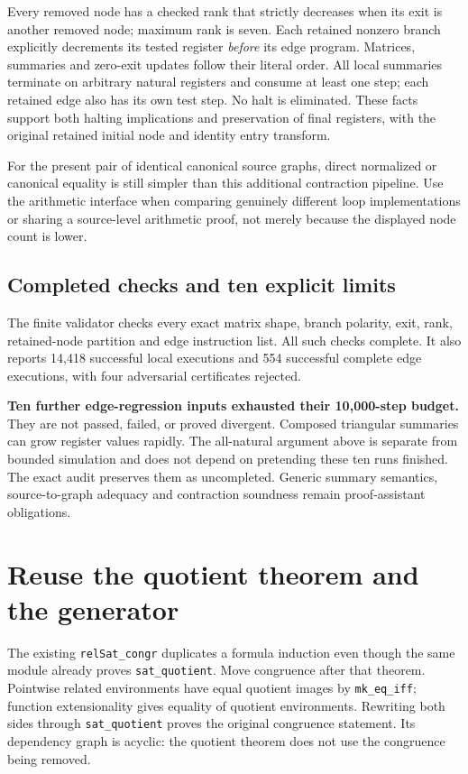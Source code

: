 \documentclass[11pt]{article}
\begin{document}
Every removed node has a checked rank that strictly decreases when its exit is another removed node; maximum rank is seven. Each retained nonzero branch explicitly decrements its tested register \emph{before} its edge program. Matrices, summaries and zero-exit updates follow their literal order. All local summaries terminate on arbitrary natural registers and consume at least one step; each retained edge also has its own test step. No halt is eliminated. These facts support both halting implications and preservation of final registers, with the original retained initial node and identity entry transform.

For the present pair of identical canonical source graphs, direct normalized or canonical equality is still simpler than this additional contraction pipeline. Use the arithmetic interface when comparing genuinely different loop implementations or sharing a source-level arithmetic proof, not merely because the displayed node count is lower.

\subsection{Completed checks and ten explicit limits}
The finite validator checks every exact matrix shape, branch polarity, exit, rank, retained-node partition and edge instruction list. All such checks complete. It also reports 14,418 successful local executions and 554 successful complete edge executions, with four adversarial certificates rejected.

\textbf{Ten further edge-regression inputs exhausted their 10,000-step budget.} They are not passed, failed, or proved divergent. Composed triangular summaries can grow register values rapidly. The all-natural argument above is separate from bounded simulation and does not depend on pretending these ten runs finished. The exact audit preserves them as uncompleted. Generic summary semantics, source-to-graph adequacy and contraction soundness remain proof-assistant obligations.

\section{Reuse the quotient theorem and the generator}
The existing \texttt{relSat\_congr} duplicates a formula induction even though the same module already proves \texttt{sat\_quotient}. Move congruence after that theorem. Pointwise related environments have equal quotient images by \texttt{mk\_eq\_iff}; function extensionality gives equality of quotient environments. Rewriting both sides through \texttt{sat\_quotient} proves the original congruence statement. Its dependency graph is acyclic: the quotient theorem does not use the congruence being removed.
\end{document}
